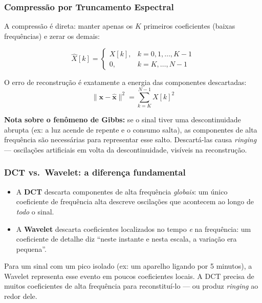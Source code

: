 \documentclass[12pt, a4paper]{article}
\begin{document}
\subsubsection{Compressão por Truncamento Espectral}

A compressão é direta: manter apenas os $K$ primeiros coeficientes (baixas frequências) e zerar os demais:

\begin{equation}
    \hat{X}[k] =
    \begin{cases}
        X[k], & k = 0, 1, \ldots, K-1 \\
        0,    & k = K, \ldots, N-1
    \end{cases}
\end{equation}

O erro de reconstrução é exatamente a energia das componentes descartadas:
\begin{equation}
    \|\mathbf{x} - \hat{\mathbf{x}}\|^2 = \sum_{k=K}^{N-1} X[k]^2
\end{equation}

\textbf{Nota sobre o fenômeno de Gibbs:} se o sinal tiver uma descontinuidade abrupta (ex: a luz acende de repente e o consumo salta), as componentes de alta frequência são necessárias para representar esse salto. Descartá-las causa \textit{ringing} — oscilações artificiais em volta da descontinuidade, visíveis na reconstrução.

\subsubsection{DCT vs.\ Wavelet: a diferença fundamental}

\begin{itemize}
    \item A \textbf{DCT} descarta componentes de alta frequência \emph{globais}: um único coeficiente de frequência alta descreve oscilações que acontecem ao longo de \emph{todo} o sinal.
    \item A \textbf{Wavelet} descarta coeficientes localizados no tempo \emph{e} na frequência: um coeficiente de detalhe diz ``neste instante e nesta escala, a variação era pequena''.
\end{itemize}

Para um sinal com um pico isolado (ex: um aparelho ligando por 5 minutos), a Wavelet representa esse evento em poucos coeficientes locais. A DCT precisa de muitos coeficientes de alta frequência para reconstituí-lo — ou produz \textit{ringing} ao redor dele.
\end{document}
